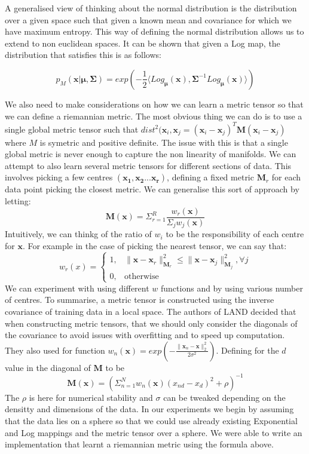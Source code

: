\documentclass{article}
\begin{document}
A generalised view of thinking about the normal distribution is the distribution over a given space such that given a known mean and covariance for which we have maximum entropy.
This way of defining the normal distribution allows us to extend to non euclidean spaces.
It can be shown that given a Log map, the distribution that satisfies this is as follows:

$$p_M(\bm{x}|\bm{\mu},\bm{\Sigma}) = exp(-\frac{1}{2}\langle Log_{\bm{\mu}}(\bm{x}),
\bm{\Sigma}^{-1}Log_{\bm{\mu}}(\bm{x})\rangle)$$

We also need to make considerations on how we can learn a metric tensor so that we can define a riemannian metric.
The most obvious thing we can do is to use a single global metric tensor such that $dist^2(\bm{x}_i, \bm{x}_j = (\bm{x}_i-\bm{x}_j)^T\bm{M}(\bm{x}_i-\bm{x}_j)$ where $M$ is symetric and positive definite.
The issue with this is that a single global metric is never enough to capture the non linearity of manifolds.
We can attempt to also learn several metric tensors for different sections of data.
This involves picking a few centres $(\bm{x_1}, \bm{x_2} ... \bm{x_r})$, defining a fixed metric $\bm{M}_r$ for each data point picking the closest metric.
We can generalise this sort of approach by letting:
$$\bm{M}(\bm{x}) = \Sigma_{r=1}^R\frac{w_r(\bm{x})}{\Sigma_jw_j(\bm{x})}$$
Intuitively, we can thinkg of the ratio of $w_i$ to be the responsibility of each centre for $\bm{x}$.
For example in the case of picking the nearest tensor, we can say that:
$$w_r(x) = \begin{cases} 1,&\|\bm{x}-\bm{x}_r\|_{\bm{M}_r}^2 \leq \|\bm{x}-\bm{x}_j\|_{\bm{M}_j}^2, \forall j \\
0,& \text{otherwise}\end{cases}$$
We can experiment with using different $w$ functions and by using various number of centres.
To summarise, a metric tensor is constructed using the inverse covariance of training data in a local space.
The authors of LAND decided that when constructing metric tensors, that we should only consider the diagonals of the covariance to avoid issues with overfitting and to speed up computation.
They also used for function $w_n(\bm{x}) = exp(-\frac{\|\bm{x}_n-\bm{x}\|_2^2}{2\sigma^2})$.
Defining for the $d$ value in the diagonal of $\bm{M}$ to be $$\bm{M}(\bm{x}) = (\Sigma_{n=1}^Nw_n(\bm{x})(x_{nd}-x_d)^2+\rho)^{-1}$$
The $\rho$ is here for numerical stability and $\sigma$ can be tweaked depending on the densitty and dimensions of the data.
In our experiments we begin by assuming that the data lies on a sphere so that we could use already existing Exponential and Log mappings and the metric tensor over a sphere.
We were able to write an implementation that learnt a riemannian metric using the formula above.
\end{document}
